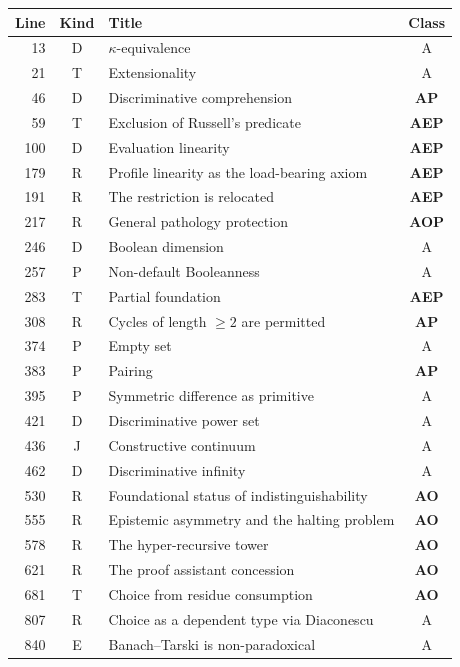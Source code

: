 \begin{center}
\scriptsize
\begin{tabular}{r|c|l|c}
\textbf{Line} & \textbf{Kind} & \textbf{Title} & \textbf{Class} \\
\hline
13 & \textsf{D} & $\kappa$-equivalence & A \\
21 & \textsf{T} & Extensionality & A \\
46 & \textsf{D} & Discriminative comprehension & \textbf{AP} \\
59 & \textsf{T} & Exclusion of Russell's predicate & \textbf{AEP} \\
100 & \textsf{D} & Evaluation linearity & \textbf{AEP} \\
179 & \textsf{R} & Profile linearity as the load-bearing axiom & \textbf{AEP} \\
191 & \textsf{R} & The restriction is relocated & \textbf{AEP} \\
217 & \textsf{R} & General pathology protection & \textbf{AOP} \\
246 & \textsf{D} & Boolean dimension & A \\
257 & \textsf{P} & Non-default Booleanness & A \\
283 & \textsf{T} & Partial foundation & \textbf{AEP} \\
308 & \textsf{R} & Cycles of length $\geq 2$ are permitted & \textbf{AP} \\
374 & \textsf{P} & Empty set & A \\
383 & \textsf{P} & Pairing & \textbf{AP} \\
395 & \textsf{P} & Symmetric difference as primitive & A \\
421 & \textsf{D} & Discriminative power set & A \\
436 & \textsf{J} & Constructive continuum & A \\
462 & \textsf{D} & Discriminative infinity & A \\
530 & \textsf{R} & Foundational status of indistinguishability & \textbf{AO} \\
555 & \textsf{R} & Epistemic asymmetry and the halting problem & \textbf{AO} \\
578 & \textsf{R} & The hyper-recursive tower & \textbf{AO} \\
621 & \textsf{R} & The proof assistant concession & \textbf{AO} \\
681 & \textsf{T} & Choice from residue consumption & \textbf{AO} \\
807 & \textsf{R} & Choice as a dependent type via Diaconescu & A \\
840 & \textsf{E} & Banach--Tarski is non-paradoxical & A \\
\end{tabular}
\end{center}

